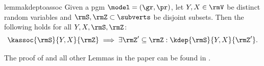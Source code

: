 \documentclass[accepted]{uai2026} %
\theoremstyle{plain}
\theoremstyle{definition}
\theoremstyle{remark}
\begin{document}
\begin{restatable}{lemma}{kdeptoassoc}
  \label{lem:k-dep-to-assoc}
  Given a \gls{pgm} $\model=(\gr,\pr)$, let $Y,X\in\rmV$ be
  distinct random variables and $\rmS,\rmZ\subset\subverts$ be disjoint
  subsets. Then the following holds for all $Y,X,\rmS,\rmZ$:
  \begin{equation}
    \label{eq:11}
    \kassoc{\rmS}{Y,X}{\rmZ}
    \implies \exists \rmZ' \subseteq \rmZ :
    \kdep{\rmS}{Y,X}{\rmZ'}.
  \end{equation}
\end{restatable}
The proof of  and all other Lemmas in the paper
can be found in .

\end{document}
